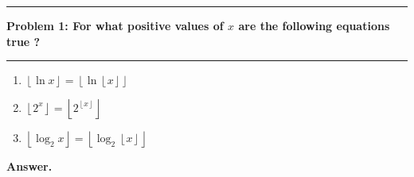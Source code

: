 \documentclass[11pt]{article}
\newcommand\question[2]{\vspace{.25in}\hrule\textbf{#1: #2}\vspace{.5em}\hrule\vspace{.10in}}
\renewcommand\part[1]{\vspace{.10in}\textbf{#1}}
\begin{document}
\raggedright
\newcommand\NAME{Shiang-Yun Yang 楊翔雲}  %
\newcommand\ANDREWID{R04922067}     %
\newcommand\HWNUM{3}              %


\question{Problem 1}{For what positive values of $x$ are the following equations true ?
}

\begin{enumerate}
	\item $\left \lfloor \ln x \right \rfloor = \left \lfloor \ln \left \lfloor x \right \rfloor \right \rfloor$
	\item $\left \lfloor 2^x \right \rfloor = \left \lfloor 2^{\left \lfloor x \right \rfloor} \right \rfloor$
	\item $\left \lfloor \log_2 x \right \rfloor = \left \lfloor \log_2 \left \lfloor x \right \rfloor \right \rfloor$
\end{enumerate}

\part{Answer.}
\end{document}

